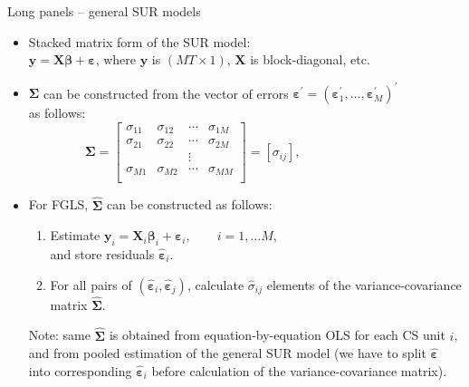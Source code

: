 \documentclass[usenames,dvipsnames]{beamer}
\begin{document}
\begin{frame}{Long panels -- general SUR models}
\small
\begin{itemize}
    \item Stacked matrix form of the SUR model:\\ \smallskip 
    $\bm{y} = \bm{X} \bm{\beta} + \bm{\varepsilon}$, \quad where $\bm{y}$ is $(MT\times 1)$, $\bm{X}$ is block-diagonal, etc.\\ \smallskip 
    \medskip
    \item $\bm{\Sigma}$ can be constructed from the vector of errors $\bm{\varepsilon}^{\prime} = (\bm{\varepsilon}_1^{\prime},\dots,\bm{\varepsilon}_M^{\prime})^{\prime}$\\
    as follows:\\ \medskip
    $\qquad \qquad ~~\bm{\Sigma} = 
    \begin{bmatrix} 
    \sigma_{11} & \sigma_{12} & \cdots & \sigma_{1M} \\ 
    \sigma_{21} & \sigma_{22} & \cdots & \sigma_{2M} \\ 
      &   & \vdots &  \\ 
    \sigma_{M1} & \sigma_{M2} & \cdots & \sigma_{MM} \\ 
    \end{bmatrix} = [\sigma_{ij}],$ \\ \medskip
    \item For FGLS, $\bm{\hat{\Sigma}}$ can be constructed as follows:
    \begin{enumerate}
        \item Estimate $\bm{y}_i = \bm{X}_i \bm{\beta}_i + \bm{\varepsilon}_i,\qquad i = 1,\dots M$, \\and store residuals $\bm{\hat{\varepsilon}}_i$.
        \item For all pairs of $(\bm{\hat{\varepsilon}}_i, \bm{\hat{\varepsilon}}_j)$, calculate $\hat{\sigma}_{ij}$ elements of the variance-covariance matrix $\bm{\hat{\Sigma}}$.
    \end{enumerate}
    Note: same $\bm{\hat{\Sigma}}$ is obtained from equation-by-equation OLS for each CS unit $i$,  and from pooled estimation of the general SUR model (we have to split $\bm{\hat{\varepsilon}}$ into corresponding $\bm{\hat{\varepsilon}}_i$ before calculation of the variance-covariance matrix).
\end{itemize}
\end{frame}
\end{document}
